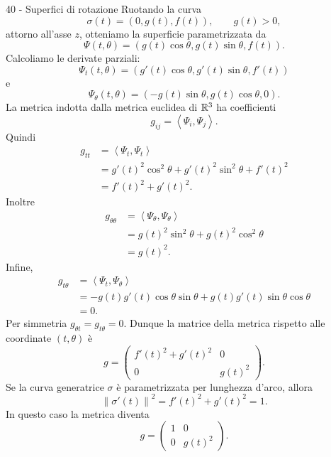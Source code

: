 \documentclass[a4paper]{article}
\begin{document}
\begin{snippetsolution}{40 - Superfici di rotazione}
    Ruotando la curva
    \[
        \sigma(t)=\left(0,g(t),f(t)\right),
        \qquad g(t)>0,
    \]
    attorno all'asse \(z\), otteniamo la superficie parametrizzata da
    \[
        \Psi(t,\theta)
        =
        \left(
            g(t)\cos\theta,
            g(t)\sin\theta,
            f(t)
        \right).
    \]
    Calcoliamo le derivate parziali:
    \[
        \Psi_t(t,\theta)
        =
        \left(
            g'(t)\cos\theta,
            g'(t)\sin\theta,
            f'(t)
        \right)
    \]
    e
    \[
        \Psi_\theta(t,\theta)
        =
        \left(
            -g(t)\sin\theta,
            g(t)\cos\theta,
            0
        \right).
    \]
    La metrica indotta dalla metrica euclidea di \(\mathbb{R}^3\) ha coefficienti
    \[
        g_{ij}=\left\langle \Psi_i,\Psi_j\right\rangle.
    \]
    Quindi
    \begin{align*}
        g_{tt}
        &=
        \left\langle \Psi_t,\Psi_t\right\rangle\\
        &=
        g'(t)^2\cos^2\theta+g'(t)^2\sin^2\theta+f'(t)^2\\
        &=
        f'(t)^2+g'(t)^2.
    \end{align*}
    Inoltre
    \begin{align*}
        g_{\theta\theta}
        &=
        \left\langle \Psi_\theta,\Psi_\theta\right\rangle\\
        &=
        g(t)^2\sin^2\theta+g(t)^2\cos^2\theta\\
        &=
        g(t)^2.
    \end{align*}
    Infine,
    \begin{align*}
        g_{t\theta}
        &=
        \left\langle \Psi_t,\Psi_\theta\right\rangle\\
        &=
        -g(t)g'(t)\cos\theta\sin\theta
        +
        g(t)g'(t)\sin\theta\cos\theta\\
        &=
        0.
    \end{align*}
    Per simmetria \(g_{\theta t}=g_{t\theta}=0\). Dunque la matrice della metrica rispetto alle coordinate \((t,\theta)\) è
    \[
        g
        =
        \begin{pmatrix}
            f'(t)^2+g'(t)^2 & 0\\
            0 & g(t)^2
        \end{pmatrix}.
    \]
    Se la curva generatrice \(\sigma\) è parametrizzata per lunghezza d'arco, allora
    \[
        \left\|\sigma'(t)\right\|^2=f'(t)^2+g'(t)^2=1.
    \]
    In questo caso la metrica diventa
    \[
        g
        =
        \begin{pmatrix}
            1 & 0\\
            0 & g(t)^2
        \end{pmatrix}.
    \]
\end{snippetsolution}
\end{document}

